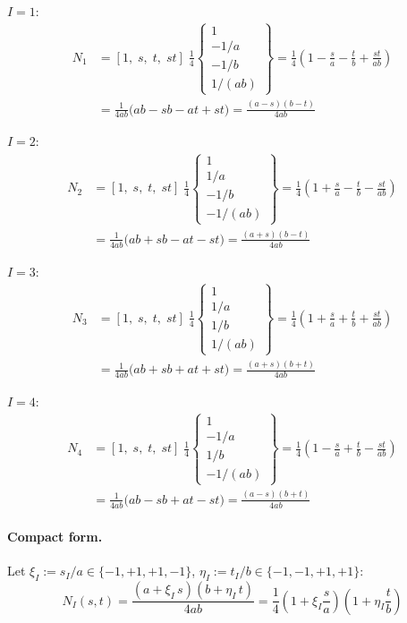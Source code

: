 \documentclass[11pt, a4paper]{article}
\begin{document}
\medskip\noindent$I=1$:
\begin{align*}
N_1 &= [1,\;s,\;t,\;st]\;\frac{1}{4}\!\begin{Bmatrix}1\\-1/a\\-1/b\\1/(ab)\end{Bmatrix}
     = \frac{1}{4}\!\left(1-\frac{s}{a}-\frac{t}{b}+\frac{st}{ab}\right) \\[4pt]
    &= \frac{1}{4ab}\big(ab-sb-at+st\big)
     = \frac{(a-s)(b-t)}{4ab}
\end{align*}

\noindent$I=2$:
\begin{align*}
N_2 &= [1,\;s,\;t,\;st]\;\frac{1}{4}\!\begin{Bmatrix}1\\1/a\\-1/b\\-1/(ab)\end{Bmatrix}
     = \frac{1}{4}\!\left(1+\frac{s}{a}-\frac{t}{b}-\frac{st}{ab}\right) \\[4pt]
    &= \frac{1}{4ab}\big(ab+sb-at-st\big)
     = \frac{(a+s)(b-t)}{4ab}
\end{align*}

\noindent$I=3$:
\begin{align*}
N_3 &= [1,\;s,\;t,\;st]\;\frac{1}{4}\!\begin{Bmatrix}1\\1/a\\1/b\\1/(ab)\end{Bmatrix}
     = \frac{1}{4}\!\left(1+\frac{s}{a}+\frac{t}{b}+\frac{st}{ab}\right) \\[4pt]
    &= \frac{1}{4ab}\big(ab+sb+at+st\big)
     = \frac{(a+s)(b+t)}{4ab}
\end{align*}

\noindent$I=4$:
\begin{align*}
N_4 &= [1,\;s,\;t,\;st]\;\frac{1}{4}\!\begin{Bmatrix}1\\-1/a\\1/b\\-1/(ab)\end{Bmatrix}
     = \frac{1}{4}\!\left(1-\frac{s}{a}+\frac{t}{b}-\frac{st}{ab}\right) \\[4pt]
    &= \frac{1}{4ab}\big(ab-sb+at-st\big)
     = \frac{(a-s)(b+t)}{4ab}
\end{align*}

\paragraph{Compact form.}
Let $\xi_I:=s_I/a\in\{-1,+1,+1,-1\}$, $\eta_I:=t_I/b\in\{-1,-1,+1,+1\}$:
\begin{equation}\label{eq:NI}
\boxed{N_I(s,t)=\frac{(a+\xi_I\,s)(b+\eta_I\,t)}{4ab}=\frac{1}{4}\!\left(1+\xi_I\frac{s}{a}\right)\!\!\left(1+\eta_I\frac{t}{b}\right)}
\end{equation}
\end{document}

